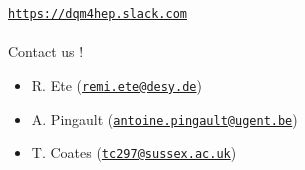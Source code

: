 \documentclass[presentation, 10pt]{beamer}
\begin{document}
\begin{frame}
\begin{minipage}{0.035\linewidth}
  \end{minipage}
  \href{https://dqm4hep.slack.com}{\tt https://dqm4hep.slack.com} \\
  ~\\
  Contact us !
  \begin{itemize}
    \item R. Ete (\href{mailto:remi.ete@desy.de}{\tt remi.ete@desy.de}) 
    \item A. Pingault (\href{mailto:antoine.pingault@ugent.be}{\tt antoine.pingault@ugent.be})
    \item T. Coates (\href{mailto:tc297@sussex.ac.uk}{\tt tc297@sussex.ac.uk})
  \end{itemize}
  


\end{frame}




\end{document}
